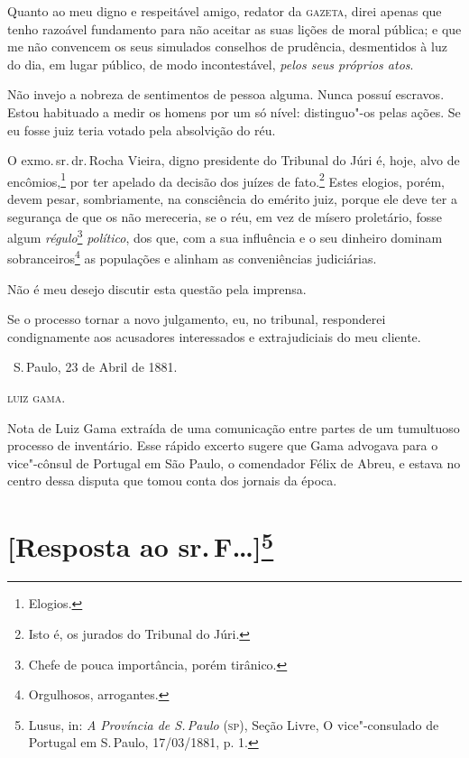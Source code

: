 Quanto ao meu digno e respeitável amigo, redator da \textsc{gazeta}, direi
apenas que tenho razoável fundamento para não aceitar as suas lições de
moral pública; e que me não convencem os seus simulados conselhos de
prudência, desmentidos à luz do dia, em lugar público, de modo
incontestável, \emph{pelos seus próprios atos}.

Não invejo a nobreza de sentimentos de pessoa alguma. Nunca possuí
escravos. Estou habituado a medir os homens por um só nível:
distinguo"-os pelas ações. Se eu fosse juiz teria votado pela absolvição
do réu.

O exmo.\,sr.\,dr.\,Rocha Vieira, digno presidente do Tribunal do Júri é,
hoje, alvo de encômios,\footnote{Elogios.} por ter apelado da decisão
dos juízes de fato.\footnote{Isto é, os jurados do Tribunal do Júri.}
Estes elogios, porém, devem pesar, sombriamente, na consciência do
emérito juiz, porque ele deve ter a segurança de que os não mereceria,
se o réu, em vez de mísero proletário, fosse algum
\emph{régulo}\footnote{Chefe de pouca importância, porém tirânico.}
\emph{político}, dos que, com a sua influência e o seu dinheiro dominam
sobranceiros\footnote{Orgulhosos, arrogantes.}
as populações e alinham as
conveniências judiciárias.

Não é meu desejo discutir esta questão pela imprensa.

Se o processo tornar a novo julgamento, eu, no tribunal, responderei
condignamente aos acusadores interessados e extrajudiciais do meu
cliente.

\bigskip

\hfill\ S.\,Paulo, 23 de Abril de 1881.\smallskip

\hfill\textsc{luiz gama}.

\pagebreak
\mbox{}\vfill
\thispagestyle{empty}

{\small\noindent
Nota de Luiz Gama extraída de uma comunicação entre partes de um
tumultuoso processo de inventário. Esse rápido excerto sugere que Gama
advogava para o vice"-cônsul de Portugal em São Paulo, o comendador Félix
de Abreu, e estava no centro dessa disputa que tomou conta dos jornais
da época.}

\chapter{{[}Resposta ao sr.\,F\ldots{}{]}\footnote[*]{Lusus, in: \emph{A Província de S.\,Paulo} (\textsc{sp}), Seção Livre, O vice"-consulado de Portugal em S.\,Paulo, 17/03/1881, p.
  1.}}


